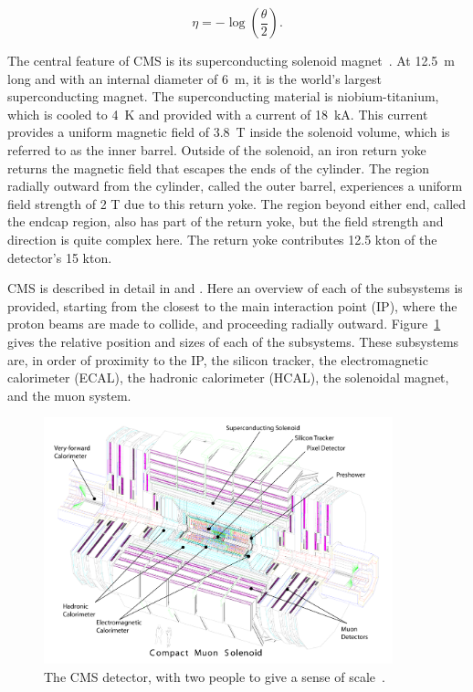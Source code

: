 \begin{equation}
\eta = -\log\left(\frac{\theta}{2}\right) .
\end{equation}

The central feature of CMS is its superconducting solenoid magnet~\cite{cms:solenoid}.
At 12.5~m long and with an internal diameter of 6~m, it is the world's largest superconducting magnet.
The superconducting material is niobium-titanium, which is cooled to 4~K and provided with a current
of 18~kA.
This current provides a uniform magnetic field of 3.8~T inside the solenoid volume, which is referred
to as the inner barrel.
Outside of the solenoid, an iron return yoke returns the magnetic field that escapes the ends
of the cylinder. The region radially outward from the cylinder, called the outer barrel, experiences
a uniform field strength of 2 T due to this return yoke. The region beyond either end, called
the endcap region, also has part of the return yoke, but the field strength
and direction is quite complex here. The return yoke contributes 12.5 kton of the detector's 15 kton.

CMS is described in detail in \cite{Chatrchyan:2008zzk} and \cite{Bayatian:922757}.
Here an overview of each of the subsystems
is provided, starting from the closest to the main interaction point (IP), where the proton beams
are made to collide, and proceeding
radially outward. Figure~\ref{fig:CMS_side} gives the relative position and sizes of each of the
subsystems. These subsystems are, in order of proximity to the IP, the silicon tracker,
the electromagnetic calorimeter (ECAL), the hadronic calorimeter (HCAL),
the solenoidal magnet, and the muon system.

\begin{figure}[ht]
 \begin{center}
   \includegraphics[width=0.90\textwidth]{figures/experiment/cms_complete_labelled.pdf}
      \end{center}
\caption{The CMS detector, with two people to give a sense of scale~\cite{Collaboration:1433717}.}
\label{fig:CMS_side}
\end{figure}

